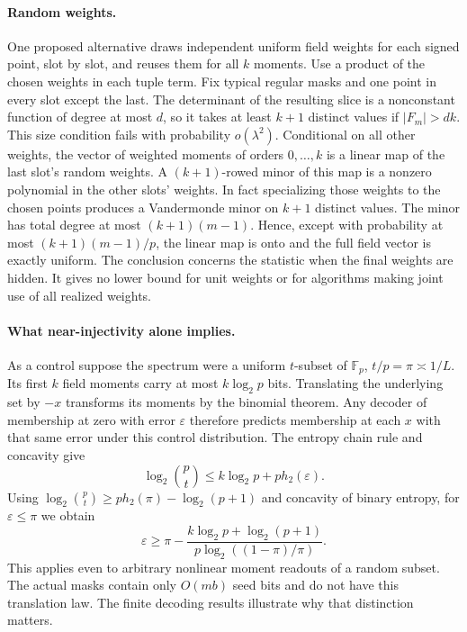 \documentclass[11pt]{article}
\newcommand{\F}{\mathbb F}
\begin{document}
\paragraph{Random weights.}
One proposed alternative draws independent uniform field weights for
each signed point, slot by slot, and reuses them for all $k$ moments.
Use a product of the chosen weights in each tuple term. Fix typical
regular masks and one point in every slot except the last. The
determinant of the resulting slice is a nonconstant function of degree
at most $d$, so it takes at least $k+1$ distinct values if
$|F_m|>dk$. This size condition fails with probability $o(\lambda^2)$.
Conditional on all other weights, the vector of weighted moments
of orders $0,\ldots,k$ is a linear map of the last slot's random
weights. A $(k+1)$-rowed minor of this map is a nonzero polynomial in
the other slots' weights. In fact specializing those weights to the
chosen points produces a Vandermonde minor on $k+1$ distinct values.
The minor has total degree at most $(k+1)(m-1)$. Hence, except with
probability at most $(k+1)(m-1)/p$, the linear map is onto and the full
field vector is exactly uniform. The conclusion concerns the statistic
when the final weights are hidden. It gives no lower bound for unit
weights or for algorithms making joint use of all realized weights.

\paragraph{What near-injectivity alone implies.}
As a control suppose the spectrum were a uniform $t$-subset of $\F_p$,
$t/p=\pi\asymp1/L$. Its first $k$ field moments carry at most $k\log_2 p$
bits. Translating the underlying set by $-x$ transforms its moments by
the binomial theorem. Any decoder of membership at zero with error
$\varepsilon$ therefore predicts membership at each $x$ with that same
error under this control distribution. The entropy chain rule and
concavity give
\[
 \log_2 {p\choose t} \le k\log_2p+p h_2(\varepsilon).
\]
Using $\log_2{p\choose t}\ge ph_2(\pi)-\log_2(p+1)$ and concavity of
binary entropy, for $\varepsilon\le\pi$ we obtain
\[
 \varepsilon\ge \pi-
 \frac{k\log_2p+\log_2(p+1)}
      {p\log_2((1-\pi)/\pi)} .
\]
This applies even to arbitrary nonlinear moment readouts of a random
subset. The actual masks contain only $O(mb)$ seed bits and do not have
this translation law. The finite decoding results illustrate why that
distinction matters.
\end{document}
